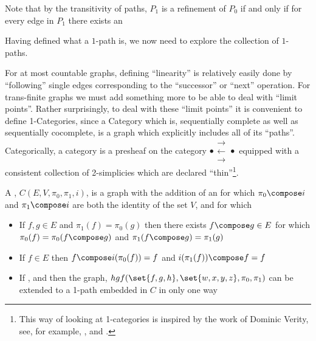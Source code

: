 \documentclass[a4paper,openany]{amsart}
\begin{document}
Note that by the transitivity of paths, $P_1$ is a refinement of $P_0$ if and only if for 
every edge in $P_1$ there exists an 

Having defined what a $1$-path is, we now need to explore the collection of $1$-paths.

For at most countable graphs, defining ``linearity'' is relatively easily done by
``following'' single edges corresponding to the ``successor'' or ``next'' operation. For
trans-finite graphs we must add something more to be able to deal with ``limit points''.
Rather surprisingly, to deal with these ``limit points'' it is convenient to define
1-Categories, since a Category which is, sequentially complete as well as sequentially
cocomplete, is a graph which explicitly includes all of its ``paths''. Categorically, a
category is a presheaf on the category
$ \bullet \substack{\mathbf{\longrightarrow} \\[-0.7ex] \mathbf{\longleftarrow} 
\\[-0.7ex] \mathbf{\longrightarrow} } \bullet $
equipped with a consistent collection of 2-simplicies which are declared
``thin''\footnote{This way of looking at 1-categories is inspired by the work of Dominic
Verity, see, for example, \cite{verity2005complicialSets},
\cite{verity2006complicialSimplicialHomotopy} and
\cite{verity2006simplicialComplicialCategories}.}.

\begin{definition}

A , $C(E, V, \pi_0, \pi_1, i)$, is a graph with the addition of an 
  for which $\pi_0 \compose i$ and $\pi_1 
\compose i$ are both the identity of the set $V$, and for which 

\begin{itemize}

\item If $f, g \in E$ and $\pi_1(f) = \pi_0(g)$ then there exists $f \compose g \in E$ for 
which $ \pi_0(f) = \pi_0(f \compose g)$ and $ \pi_1(f \compose g) = \pi_1(g)$

\item If $f \in E$ then $ f \compose i(\pi_0(f)) = f$ and $i(\pi_1(f)) \compose f = f$

\item If ,  and  then the graph, $hgf(\set{f,
g, h}, \set{w, x, y, z}, \pi_0, \pi_1)$ can be extended to a 1-path embedded in $C$ in only 
one way

\end{itemize}

\end{definition}
\end{document}
